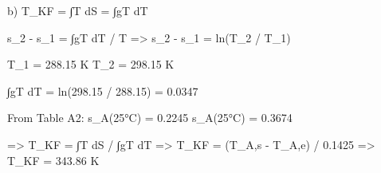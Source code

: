 b) T_KF = ∫T dS = ∫gT dT  

s_2 - s_1 = ∫gT dT / T  
=> s_2 - s_1 = ln(T_2 / T_1)  

T_1 = 288.15 K  
T_2 = 298.15 K  

∫gT dT = ln(298.15 / 288.15) = 0.0347  

From Table A2:  
s_A(25°C) = 0.2245  
s_A(25°C) = 0.3674  

=> T_KF = ∫T dS / ∫gT dT  
=> T_KF = (T_A,s - T_A,e) / 0.1425  
=> T_KF = 343.86 K